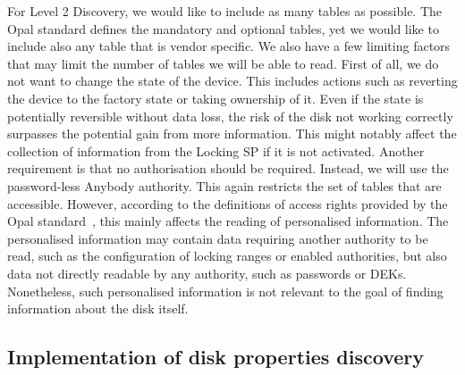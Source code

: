 For Level 2 Discovery, we would like to include as many tables as possible. The Opal standard defines the mandatory and optional tables, yet we would like to include also any table that is vendor specific.
We also have a few limiting factors that may limit the number of tables we will be able to read.
First of all, we do not want to change the state of the device. This includes actions such as reverting the device to the factory state or taking ownership of it. Even if the state is potentially reversible without data loss, the risk of the disk not working correctly surpasses the potential gain from more information. This might notably affect the collection of information from the Locking SP if it is not activated.
Another requirement is that no authorisation should be required. Instead, we will use the password-less Anybody authority. This again restricts the set of tables that are accessible. However, according to the definitions of access rights provided by the Opal standard~\cite{tcg-opal2}, this mainly affects the reading of personalised information.
The personalised information may contain data requiring another authority to be read, such as the configuration of locking ranges or enabled authorities, but also data not directly readable by any authority, such as passwords or DEKs.
Nonetheless, such personalised information is not relevant to the goal of finding information about the disk itself.



\subsection{Implementation of disk properties discovery}

